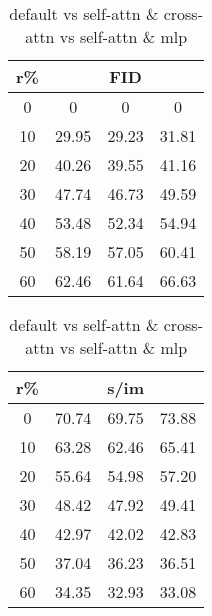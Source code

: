 \begin{table}[htp]
\caption{default vs self-attn \& cross-attn vs self-attn \& mlp}
    \begin{minipage}{0.48\textwidth}
        \centering
        \begin{tabular}{|c||c|c|c|}
            \hline
            \multicolumn{1}{|c||}{r\%} & \multicolumn{3}{c|}{FID}\\
            \hline
            0 & 0 & 0 & 0 \\
            10 & 29.95 & 29.23 & 31.81 \\
            20 & 40.26 & 39.55 & 41.16 \\
            30 & 47.74 & 46.73 & 49.59 \\
            40 & 53.48 & 52.34 & 54.94 \\
            50 & 58.19 & 57.05 & 60.41 \\
            60 & 62.46 & 61.64 & 66.63 \\
            \hline
        \end{tabular}
    \end{minipage}
    \hfill
    \begin{minipage}{0.48\textwidth}
        \centering
        \begin{tabular}{|c||c|c|c|}
            \hline
            \multicolumn{1}{|c||}{r\%} & \multicolumn{3}{c|}{s/im}\\
            \hline
            0 & 70.74 & 69.75 & 73.88 \\
            10 & 63.28 & 62.46 & 65.41 \\
            20 & 55.64 & 54.98 & 57.20 \\
            30 & 48.42 & 47.92 & 49.41 \\
            40 & 42.97 & 42.02 & 42.83 \\
            50 & 37.04 & 36.23 & 36.51 \\
            60 & 34.35 & 32.93 & 33.08 \\
            \hline
        \end{tabular}
    \end{minipage}
\end{table}